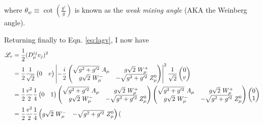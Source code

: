     where $\theta_w \equiv \cot(\frac{g'}{g})$ is known as the \textit{weak mixing angle} (AKA the Weinberg angle).

    Returning finally to Eqn. \ref{eq:lagv}, I now have
    \begin{equation} \begin{split}
        \label{eq:lagv_full}
        \Lag_v & = \frac{1}{2} (D_{\mu}^{ij} v_j)^2 \\
        & = \frac{1}{2}
            \frac{1}{\sqrt{2}} \begin{pmatrix} 0 & v \end{pmatrix}
            \left| -\frac{i}{2}
                \begin{pmatrix} 
                    \sqrt{g^2 + g^{\prime 2}}\ A_{\mu} & g \sqrt{2}\ W^+_{\mu} \\
                    g \sqrt{2}\ W^-_{\mu} & - \sqrt{g^2 + g^{\prime 2}}\ Z^0_{\mu}
                \end{pmatrix}
            \right|^2
            \frac{1}{\sqrt{2}} \begin{pmatrix} 0 \\ v \end{pmatrix} \\
        & = \frac{1}{2} \frac{v^2}{2} \frac{1}{4}
            \begin{pmatrix} 0 & 1 \end{pmatrix}
            \begin{pmatrix} 
                \sqrt{g^2 + g^{\prime 2}}\ A_{\mu} & g \sqrt{2}\ W^+_{\mu} \\
                g \sqrt{2}\ W^-_{\mu} & - \sqrt{g^2 + g^{\prime 2}}\ Z^0_{\mu}
            \end{pmatrix}
            \begin{pmatrix} 
                \sqrt{g^2 + g^{\prime 2}}\ A_{\mu} & g \sqrt{2}\ W^+_{\mu} \\
                g \sqrt{2}\ W^-_{\mu} & - \sqrt{g^2 + g^{\prime 2}}\ Z^0_{\mu}
            \end{pmatrix}
            \begin{pmatrix} 0 \\ 1 \end{pmatrix} \\
        & = \frac{1}{2} \frac{v^2}{2} \frac{1}{4}
            \begin{pmatrix} 
                g \sqrt{2}\ W^-_{\mu} & - \sqrt{g^2 + g^{\prime 2}}\ Z^0_{\mu}
            \end{pmatrix}
            \begin{pmatrix} 

\end{pmatrix}
\end{split}
\end{equation}
